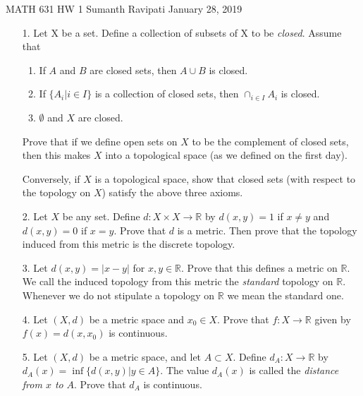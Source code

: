 \documentclass[12pt,letterpaper,reqno]{amsart}
\newcommand{\R}{\mathbb R}
\begin{document}
\begin{center}\large{
    MATH 631\quad
    HW 1\quad
    Sumanth Ravipati\quad
    January 28, 2019}
\end{center}
\vspace{.25in}

\begin{enumerate}
\item[1.] Let X be a set. Define a collection of subsets of X to be \textit{closed}. Assume that
\begin{enumerate}
    \item If $A$ and $B$ are closed sets, then $A \cup B$ is closed.
    \item If $\{A_i | i \in I \}$ is a collection of closed sets, then $\cap_{i \in I} A_i$ is closed.
    \item $\emptyset$ and $X$ are closed. \newline
\end{enumerate}
Prove that if we define open sets on $X$ to be the complement of closed sets, then this makes $X$ into a topological space (as we defined on the first day).
\begin{flushleft}

\end{flushleft}
Conversely, if $X$ is a topological space, show that closed sets (with respect to the topology on $X$) satisfy the above three axioms.
\begin{flushleft}

\end{flushleft}
\item[2.] Let $X$ be any set. Define $d : X \times X \rightarrow \R$ by $d(x,y) = 1$ if $x \not= y$ and $d(x,y) = 0$ if $x=y$. Prove that $d$ is a metric. Then prove that the topology induced from this metric is the discrete topology.
\begin{flushleft}

\end{flushleft}
\item[3.] Let $d(x,y) = |x-y|$ for $x,y \in \R$. Prove that this defines a metric on $\R$. We call the induced topology from this metric the \textit{standard} topology on $\R$. Whenever we do not stipulate a topology on $\R$ we mean the standard one.
\begin{flushleft}

\end{flushleft}
\item[4.] Let $(X,d)$ be a metric space and $x_0 \in X$. Prove that $f : X \rightarrow \R$ given by $f(x) = d(x,x_0)$ is continuous.
\begin{flushleft}

\end{flushleft}
\item[5.] Let $(X,d)$ be a metric space, and let $A \subset X$. Define $d_A : X \rightarrow \R$ by $d_A(x) = \inf\{d(x,y) | y \in A\}$. The value $d_A(x)$ is called the \textit{distance from $x$ to} $A$. Prove that $d_A$ is continuous.
\begin{flushleft}

\end{flushleft}
\end{enumerate}
\end{document}

